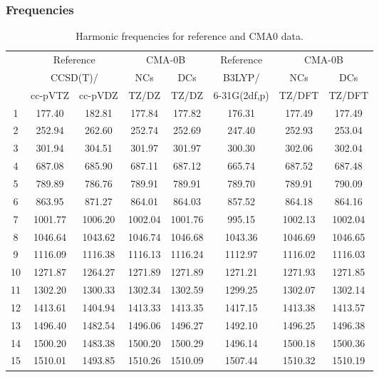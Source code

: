 \documentclass[10pt,oneside]{article}
\begin{document}
\subsubsection*{Frequencies}
\begin{table}[h!]
\centering
\caption{Harmonic frequencies for reference and CMA0 data.}
\begin{tabular}{cccccccc}
\toprule
{} & \multicolumn{2}{c}{Reference} & \multicolumn{2}{c}{CMA-0B} &    Reference & \multicolumn{2}{c}{CMA-0B} \\
{} & \multicolumn{2}{c}{CCSD(T)/} &     NCs &     DCs &       B3LYP/ &     NCs &     DCs \\
{} &   cc-pVTZ & cc-pVDZ &   TZ/DZ &   TZ/DZ & 6-31G(2df,p) &  TZ/DFT &  TZ/DFT \\
\midrule
1  &    177.40 &  182.81 &  177.84 &  177.82 &       176.31 &  177.49 &  177.49 \\
2  &    252.94 &  262.60 &  252.74 &  252.69 &       247.40 &  252.93 &  253.04 \\
3  &    301.94 &  304.51 &  301.97 &  301.97 &       300.30 &  302.06 &  302.04 \\
4  &    687.08 &  685.90 &  687.11 &  687.12 &       665.74 &  687.52 &  687.48 \\
5  &    789.89 &  786.76 &  789.91 &  789.91 &       789.70 &  789.91 &  790.09 \\
6  &    863.95 &  871.27 &  864.01 &  864.03 &       857.52 &  864.18 &  864.16 \\
7  &   1001.77 & 1006.20 & 1002.04 & 1001.76 &       995.15 & 1002.13 & 1002.04 \\
8  &   1046.64 & 1043.62 & 1046.74 & 1046.68 &      1043.36 & 1046.69 & 1046.65 \\
9  &   1116.09 & 1116.38 & 1116.13 & 1116.24 &      1112.97 & 1116.02 & 1116.03 \\
10 &   1271.87 & 1264.27 & 1271.89 & 1271.89 &      1271.21 & 1271.93 & 1271.85 \\
11 &   1302.20 & 1300.33 & 1302.34 & 1302.59 &      1299.25 & 1302.07 & 1302.14 \\
12 &   1413.61 & 1404.94 & 1413.33 & 1413.35 &      1417.15 & 1413.38 & 1413.57 \\
13 &   1496.40 & 1482.54 & 1496.06 & 1496.27 &      1492.10 & 1496.25 & 1496.38 \\
14 &   1500.20 & 1483.38 & 1500.20 & 1500.29 &      1496.14 & 1500.18 & 1500.36 \\
15 &   1510.01 & 1493.85 & 1510.26 & 1510.09 &      1507.44 & 1510.32 & 1510.19 \\

\end{tabular}
\end{table}
\end{document}
